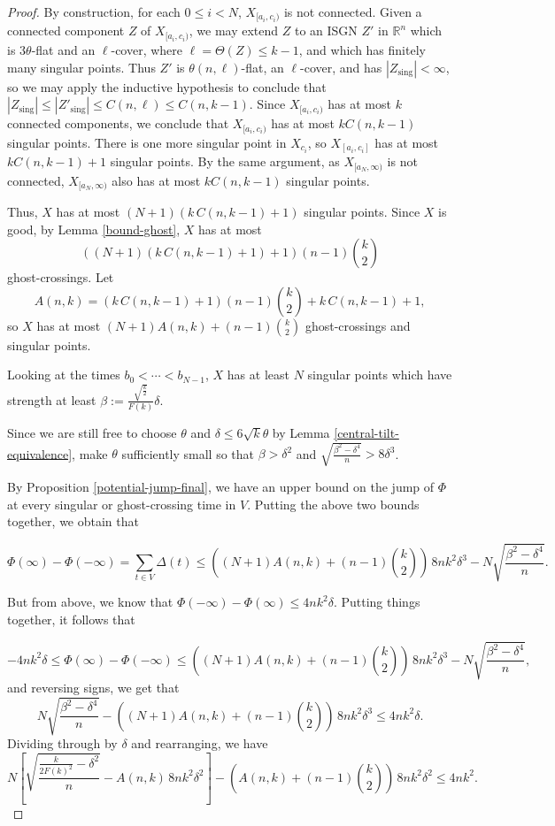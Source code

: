 \documentclass[11pt,reqno,twoside]{amsart}
\newcommand{\sing}{\mathrm{sing}}
\theoremstyle{definition}
\begin{document}
\begin{proof}
    By construction, for each $0 \leq i < N$, $X_{[a_i,c_i)}$ is not connected. Given a connected component $Z$ of $X_{[a_i,c_i)}$, we may extend $Z$ to an ISGN $Z'$ in $\mathbb{R}^n$ which is $3\theta$-flat and an $\ell$-cover, where $\ell = \Theta(Z) \leq k-1$, and which has finitely many singular points.
    Thus $Z'$ is $\theta(n,\ell)$-flat, an $\ell$-cover, and has $|Z_\sing| < \infty$, so we may apply the inductive hypothesis to conclude that $|Z_\sing| \leq |Z'_\sing| \leq C(n,\ell) \leq C(n,k-1).$ Since $X_{[a_i,c_i)}$ has at most $k$ connected components, we conclude that $X_{[a_i,c_i)}$ has at most $k C(n,k-1)$ singular points. There is one more singular point in $X_{c_i}$, so $X_{[a_i,c_i]}$ has at most $k C(n,k-1) + 1$ singular points.
    By the same argument, as $X_{[a_N,\infty)}$ is not connected, $X_{[a_N,\infty)}$ also has at most $k C(n,k-1)$ singular points.

    Thus, $X$ has at most $(N + 1) (k \, C(n,k-1) + 1)$ singular points. Since $X$ is good, by Lemma \ref{bound-ghost}, $X$ has at most 
    \[((N+ 1) (k \, C(n,k-1) + 1) + 1)(n-1){k \choose 2}\]
    ghost-crossings.
    Let
    \[A(n,k) = (k \, C(n,k-1) + 1)(n-1){k \choose 2} + k \, C(n,k-1) + 1,  \]
    so $X$ has at most $(N + 1) A(n,k) + (n-1){k \choose 2}$ ghost-crossings and singular points.

    Looking at the times $b_0 < \cdots < b_{N-1}$, $X$ has at least $N$ singular points which have strength at least $\beta := \frac{\sqrt{\frac{k}{2}}}{F(k)} \delta.$ 

    Since we are still free to choose $\theta$ and $\delta \leq 6\sqrt{k} \theta$ by Lemma \ref{central-tilt-equivalence}, make $\theta$ sufficiently small so that $\beta > \delta^2$ and $\sqrt{\frac{\beta^2-\delta^4}{n}}>8\delta^3$.
    
    By Proposition \ref{potential-jump-final}, we have an upper bound on the jump of $\Phi$ at every singular or ghost-crossing time in $V$. Putting the above two bounds together, we obtain that

    \[\Phi(\infty) - \Phi(-\infty) = \sum_{t \in V} \Delta(t) \leq 
    \left((N + 1) A(n,k) + (n-1){k \choose 2}\right) \, 8nk^2\delta^3 - N\sqrt{\frac{\beta^2-\delta^4}{n}}. \]

    But from above, we know that $\Phi(-\infty) - \Phi(\infty) \leq 4nk^2\delta$. Putting things together, it follows that

    \[-4nk^2\delta \leq \Phi(\infty) - \Phi(-\infty) \leq 
    \left((N + 1) A(n,k) + (n-1){k \choose 2}\right) \, 8nk^2\delta^3 - N\sqrt{\frac{\beta^2-\delta^4}{n}}, \]
    and reversing signs, we get that
    \[ N\sqrt{\frac{\beta^2-\delta^4}{n}} - \left((N + 1) A(n,k) + (n-1){k \choose 2}\right) \, 8nk^2\delta^3 \leq 4nk^2\delta.\]
    Dividing through by $\delta$ and rearranging, we have 
\[ N\left[\sqrt{\frac{\frac{k}{2F(k)^2}-\delta^2}{n}} -  A(n,k) \, 8nk^2\delta^2\right] - \left(A(n,k) + (n-1){k \choose 2}\right) \, 8nk^2\delta^2 \leq 4nk^2.\]


\end{proof}
\end{document}
